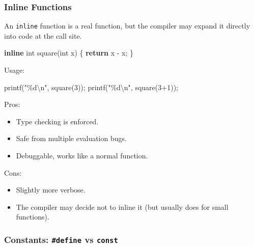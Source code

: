 \documentclass[
  letterpaper,
  DIV=11,
  numbers=noendperiod]{scrreprt}
\newenvironment{Shaded}{\begin{snugshade}}{\end{snugshade}}
\newcommand{\ControlFlowTok}[1]{\textcolor[rgb]{0.00,0.23,0.31}{\textbf{#1}}}
\newcommand{\DataTypeTok}[1]{\textcolor[rgb]{0.68,0.00,0.00}{#1}}
\newcommand{\DecValTok}[1]{\textcolor[rgb]{0.68,0.00,0.00}{#1}}
\newcommand{\KeywordTok}[1]{\textcolor[rgb]{0.00,0.23,0.31}{\textbf{#1}}}
\newcommand{\NormalTok}[1]{\textcolor[rgb]{0.00,0.23,0.31}{#1}}
\newcommand{\OperatorTok}[1]{\textcolor[rgb]{0.37,0.37,0.37}{#1}}
\newcommand{\SpecialCharTok}[1]{\textcolor[rgb]{0.37,0.37,0.37}{#1}}
\newcommand{\StringTok}[1]{\textcolor[rgb]{0.13,0.47,0.30}{#1}}
\providecommand{\tightlist}{%
  \setlength{\itemsep}{0pt}\setlength{\parskip}{0pt}}
\begin{document}
\subsubsection{Inline Functions}\label{inline-functions}

An \texttt{inline} function is a real function, but the compiler may
expand it directly into code at the call site.

\begin{Shaded}
\begin{Highlighting}[]
\KeywordTok{inline} \DataTypeTok{int}\NormalTok{ square}\OperatorTok{(}\DataTypeTok{int}\NormalTok{ x}\OperatorTok{)} \OperatorTok{\{}
    \ControlFlowTok{return}\NormalTok{ x }\OperatorTok{{-}}\NormalTok{ x}\OperatorTok{;}
\OperatorTok{\}}
\end{Highlighting}
\end{Shaded}

Usage:

\begin{Shaded}
\begin{Highlighting}[]
\NormalTok{printf}\OperatorTok{(}\StringTok{"}\SpecialCharTok{\%d\textbackslash{}n}\StringTok{"}\OperatorTok{,}\NormalTok{ square}\OperatorTok{(}\DecValTok{3}\OperatorTok{));}
\NormalTok{printf}\OperatorTok{(}\StringTok{"}\SpecialCharTok{\%d\textbackslash{}n}\StringTok{"}\OperatorTok{,}\NormalTok{ square}\OperatorTok{(}\DecValTok{3}\OperatorTok{+}\DecValTok{1}\OperatorTok{));}
\end{Highlighting}
\end{Shaded}

Pros:

\begin{itemize}
\tightlist
\item
  Type checking is enforced.
\item
  Safe from multiple evaluation bugs.
\item
  Debuggable, works like a normal function.
\end{itemize}

Cons:

\begin{itemize}
\tightlist
\item
  Slightly more verbose.
\item
  The compiler may decide not to inline it (but usually does for small
  functions).
\end{itemize}

\subsubsection{\texorpdfstring{Constants: \texttt{\#define} vs
\texttt{const}}{Constants: \#define vs const}}\label{constants-define-vs-const}
\end{document}
